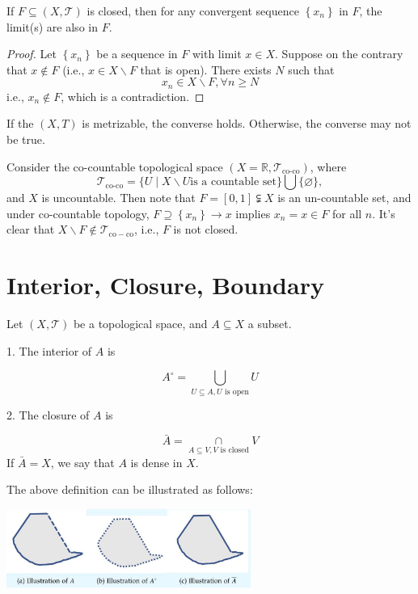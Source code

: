 \begin{example}
\begin{proposition} If \(F \subseteq  \left({X,\mathcal{T}}\right)\) is closed, then for any convergent sequence \(\left\{  x_n\right\}\) in \(F\), the limit(s) are also in \(F\).
\end{proposition}
\begin{proof} Let \(\left\{  x_n\right\}\) be a sequence in \(F\) with limit \(x \in  X\). Suppose on the contrary that \(x \notin  F\) (i.e., \(x \in  X \smallsetminus  F\) that is open). There exists \(N\) such that
\[
x_n \in  X \smallsetminus  F,\forall n \geq  N
\]
i.e., \(x_n \notin  F\), which is a contradiction.
\end{proof}

If the $(X, T)$ is metrizable, the converse holds. Otherwise, the converse may not be true. 
\begin{example} Consider the co-countable topological space \(\left({X = \mathbb{R},{\mathcal{T}}_{\text{co-co}}}\right)\), where
\[
{\mathcal{T}}_{\mathrm{{co}}\text{-co}} = \{ U \mid  X \smallsetminus  U\text{is a countable set}\} \bigcup \{ \varnothing \},
\]
and \(X\) is uncountable. Then note that \(F = \left\lbrack  {0,1}\right\rbrack   \subsetneqq  X\) is an un-countable set, and under co-countable topology, \(F \supseteq  \left\{  x_n\right\}   \rightarrow  x\) implies \(x_n = x \in  F\) for all \(n\). It’s clear that \(X \smallsetminus  F \notin  {\mathcal{T}}_{\mathrm{{co}} - \mathrm{{co}}}\), i.e., \(F\) is not closed.
\end{example}

\section{Interior, Closure, Boundary}
\begin{definition} \label{def:interior_closure} Let $(X, \mathcal{T})$ be a topological space, and \(A \subseteq  X\) a subset.

1. The interior of \(A\) is

\[
{A}^{ \circ } = \mathop{\bigcup}\limits_{{U \subseteq  A,U\text{ is open}}}U
\]

2. The closure of \(A\) is

\[
\bar{A} = \mathop{\cap}\limits_{{A \subseteq  V,V\text{ is closed}}}V
\]
If \(\bar{A} = X\), we say that \(A\) is dense in \(X\).
\end{definition}

The above definition can be illustrated as follows:
\begin{center}
\includegraphics[width=0.6\textwidth]{images/Ch2_interior_closure.jpg}
\end{center}


\end{example}
